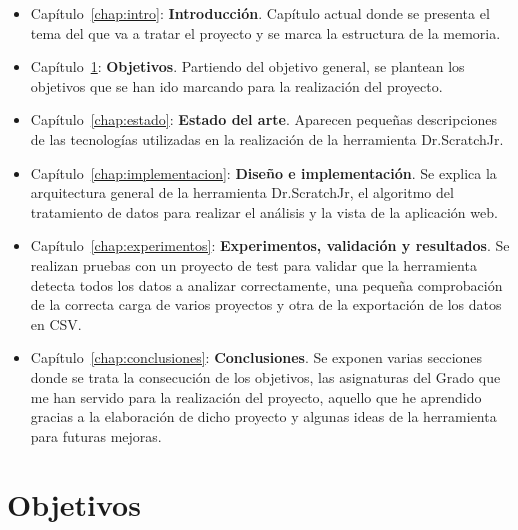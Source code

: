 \documentclass[a4paper, 12pt]{book}
\begin{document}
\begin{itemize}
    \item Capítulo~\ref{chap:intro}: \textbf{Introducción}.
    Capítulo actual donde se presenta el tema del que va a tratar el proyecto y se marca la estructura de la memoria.
    \item Capítulo~\ref{chap:objetivos}: \textbf{Objetivos}. 
    Partiendo del objetivo general, se plantean los objetivos que se han ido marcando para la realización del proyecto.
    \item Capítulo~\ref{chap:estado}: \textbf{Estado del arte}. 
    Aparecen pequeñas descripciones de las tecnologías utilizadas en la realización de la herramienta Dr.ScratchJr.
    \item Capítulo~\ref{chap:implementacion}: \textbf{Diseño e implementación}. 
    Se explica la arquitectura general de la herramienta Dr.ScratchJr, el algoritmo del tratamiento de datos para realizar el análisis y la vista de la aplicación web.
    \item Capítulo~\ref{chap:experimentos}: \textbf{Experimentos, validación y resultados}. 
    Se realizan pruebas con un proyecto de test para validar que la herramienta detecta todos los datos a analizar correctamente, una pequeña comprobación de la correcta carga de varios proyectos y otra de la exportación de los datos en CSV.
    \item Capítulo~\ref{chap:conclusiones}: \textbf{Conclusiones}. 
    Se exponen varias secciones donde se trata la consecución de los objetivos, las asignaturas del Grado que me han servido para la realización del proyecto, aquello que he aprendido gracias a la elaboración de dicho proyecto y algunas ideas de la herramienta para futuras mejoras.
    
\end{itemize}




\cleardoublepage %
\chapter{Objetivos} %
\label{chap:objetivos} %
\end{document}
